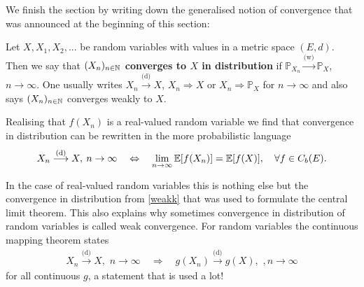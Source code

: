 We finish the section by writing down the generalised notion of convergence that was announced at the beginning of this section:
\begin{ldef}
\begin{deff}
	Let $X, X_1, X_2,...$ be random variables with values in a metric space $(E,d)$. Then we say that \textbf{$(X_n)_{n\in\mathbb{N}}$ converges to $X$ in distribution} if $\mathbb{P}_{X_n} \overset{\text{(w)}}{\longrightarrow} \mathbb{P}_{X}$, $n\to \infty$. One usually writes $X_n\overset{\text{(d)}}{\to} X$, $X_n \Rightarrow X$ or $X_n \Rightarrow \mathbb{P}_X$ for $n\to\infty$ and also says $(X_n)_{n\in\mathbb{N}}$ converges weakly to $X$. 
\end{deff}
\end{ldef}
Realising that $f(X_n)$ is a real-valued random variable we find that convergence in distribution can be rewritten in the more probabilistic language 
\begin{align*}
	X_n \overset{\text{(d)}}{\longrightarrow}X,\: n\to\infty\quad  \Leftrightarrow\quad \lim_{n\to\infty} \mathbb{E}[f(X_n)]= \mathbb{E}[f(X)],\quad \forall f\in C_b(E).
\end{align*}


In the case of real-valued random variables this is nothing else but the convergence in distribution from \eqref{weakk} that was used to formulate the central limit theorem. This also explains why sometimes convergence in distribution of random variables is called weak convergence. For random variables the continuous mapping theorem states
\begin{align*}
	X_n\overset{\text{(d)}}{\longrightarrow} X,\,\,n\to\infty\quad \Longrightarrow\quad g(X_n)\overset{\text{(d)}}{\longrightarrow} g(X),\,\,,n\to\infty
\end{align*}
for all continuous $g$, a statement that is used a lot!\smallskip

